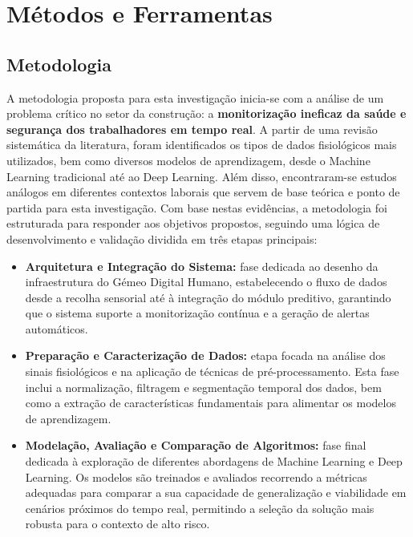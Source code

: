 \chapter{Métodos e Ferramentas} %
\label{chap:MetodosFerramentas} %

\section{Metodologia}
\label{sec:metodologia-cap3}

A metodologia proposta para esta investigação inicia-se com a análise de um problema crítico no setor da construção: a \textbf{monitorização ineficaz da saúde e segurança dos trabalhadores em tempo real}. A partir de uma revisão sistemática da literatura, foram identificados os tipos de dados fisiológicos mais utilizados, bem como diversos modelos de aprendizagem, desde o Machine Learning tradicional até ao Deep Learning. Além disso, encontraram-se estudos análogos em diferentes contextos laborais que servem de base teórica e ponto de partida para esta investigação. Com base nestas evidências, a metodologia foi estruturada para responder aos objetivos propostos, seguindo uma lógica de desenvolvimento e validação dividida em três etapas principais:

\begin{itemize}
\item \textbf{Arquitetura e Integração do Sistema:} fase dedicada ao desenho da infraestrutura do Gémeo Digital Humano, estabelecendo o fluxo de dados desde a recolha sensorial até à integração do módulo preditivo, garantindo que o sistema suporte a monitorização contínua e a geração de alertas automáticos.
\item \textbf{Preparação e Caracterização de Dados:} etapa focada na análise dos sinais fisiológicos e na aplicação de técnicas de pré-processamento. Esta fase inclui a normalização, filtragem e segmentação temporal dos dados, bem como a extração de características fundamentais para alimentar os modelos de aprendizagem.
\item \textbf{Modelação, Avaliação e Comparação de Algoritmos:} fase final dedicada à exploração de diferentes abordagens de Machine Learning e Deep Learning. Os modelos são treinados e avaliados recorrendo a métricas adequadas para comparar a sua capacidade de generalização e viabilidade em cenários próximos do tempo real, permitindo a seleção da solução mais robusta para o contexto de alto risco.
\end{itemize}

